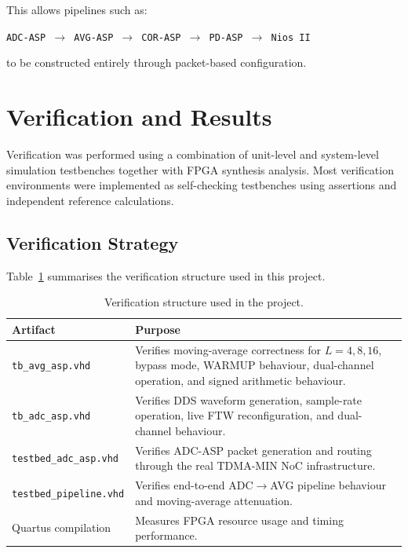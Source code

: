 \documentclass[10pt, a4paper]{article}
\begin{document}
This allows pipelines such as:

\begin{center}
\texttt{ADC-ASP $\rightarrow$ AVG-ASP $\rightarrow$ COR-ASP $\rightarrow$ PD-ASP $\rightarrow$ Nios II}
\end{center}

to be constructed entirely through packet-based configuration.

\section{Verification and Results}
\label{sec:verification}

Verification was performed using a combination of unit-level and system-level simulation testbenches together with FPGA synthesis analysis. Most verification environments were implemented as self-checking testbenches using assertions and independent reference calculations.

\subsection{Verification Strategy}

Table~\ref{tab:verification} summarises the verification structure used in this project.

\begin{table}[ht]
    \centering
    \caption{Verification structure used in the project.}
    \label{tab:verification}
    \begin{tabular}{|l|p{8cm}|}
        \hline
        \textbf{Artifact} & \textbf{Purpose} \\ \hline
        
        \texttt{tb\_avg\_asp.vhd} &
        Verifies moving-average correctness for $L=4,8,16$, bypass mode, WARMUP behaviour, dual-channel operation, and signed arithmetic behaviour. \\ \hline
        
        \texttt{tb\_adc\_asp.vhd} &
        Verifies DDS waveform generation, sample-rate operation, live FTW reconfiguration, and dual-channel behaviour. \\ \hline
        
        \texttt{testbed\_adc\_asp.vhd} &
        Verifies ADC-ASP packet generation and routing through the real TDMA-MIN NoC infrastructure. \\ \hline
        
        \texttt{testbed\_pipeline.vhd} &
        Verifies end-to-end ADC$\rightarrow$AVG pipeline behaviour and moving-average attenuation. \\ \hline
        
        Quartus compilation &
        Measures FPGA resource usage and timing performance. \\ \hline
    \end{tabular}
\end{table}
\end{document}
